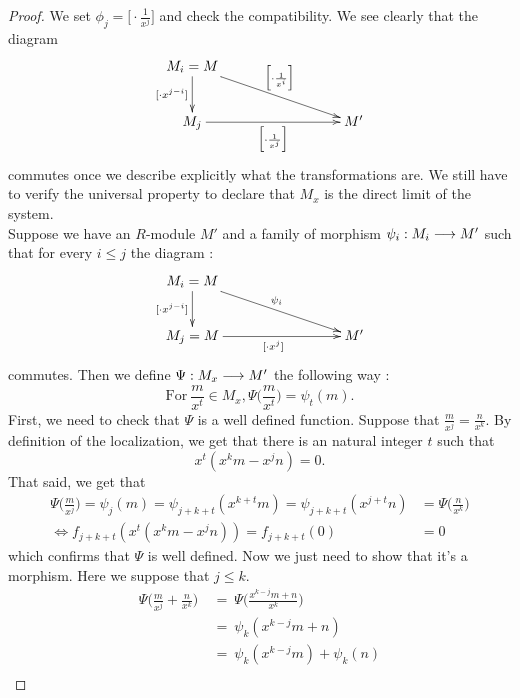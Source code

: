 \documentclass[11pt, a4paper, twoside]{article}
\begin{document}
\begin{proof}
We set $\phi_j=\Big[\cdot \frac{1}{x^j}\Big]$ and check the compatibility. We see clearly that the diagram 
\begin{displaymath}
    \xymatrix{
    M_i=M\ar[d]_{[\cdot x^{j-i}]}\ar[rrrd]^{\Big[\cdot \frac{1}{x^i}\Big]}\\
    M_j\ar[rrr]_{\Big[\cdot \frac{1}{x^j}\Big]} & & &  M'\\
    }
\end{displaymath}
commutes once we describe explicitly what the transformations are. We still have to verify the universal property to declare that $M_x$ is the direct limit of the system.\\
Suppose we have an $R$-module $M'$ and a family of morphism $\psi_i:M_i\longrightarrow M'$ such that for every $i\leq j$ the diagram :
\begin{displaymath}
    \xymatrix{
    M_i=M\ar[d]_{[\cdot x^{j-i}]}\ar[rrrd]^{\psi_i}\\
    M_j=M\ar[rrr]_{[\cdot x^j]} & & &  M'\\
    }
\end{displaymath}
commutes. Then we define $\Psi:M_x\longrightarrow M'$ the following way :
\begin{displaymath}
    \mathrm{For}\ \frac{m}{x^t}\in M_x, \Psi\bigg(\frac{m}{x^t}\bigg)=\psi_t(m).
\end{displaymath}
First, we need to check that $\Psi$ is a well defined function. Suppose that $\frac{m}{x^j}=\frac{n}{x^k}$. By definition of the localization, we get that there is an natural integer $t$ such that 
\begin{displaymath}
    x^t(x^km-x^jn)=0.
\end{displaymath}
That said, we get that 
\begin{align*}
    \Psi\bigg(\frac{m}{x^j}\bigg)=\psi_j(m)=\psi_{j+k+t}(x^{k+t}m)=\psi_{j+k+t}(x^{j+t}n)&=\Psi\bigg(\frac{n}{x^k}\bigg)\\
    \Leftrightarrow f_{j+k+t}(x^t(x^km-x^jn))=f_{j+k+t}(0)&=0
\end{align*}
which confirms that $\Psi$ is well defined. Now we just need to show that it's a morphism. Here we suppose that $j\leq k$. 
\begin{align*}
    \Psi\bigg(\frac{m}{x^j}+\frac{n}{x^k}\bigg)\ &=\ \Psi\bigg(\frac{x^{k-j}m+n}{x^k}\bigg)\\
                                       &=\ \psi_k(x^{k-j}m+n)\\
                                       &=\ \psi_k(x^{k-j}m)+\psi_k(n)\\

\end{align*}
\end{proof}
\end{document}
